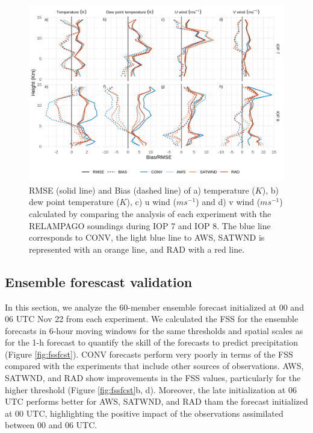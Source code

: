 \documentclass[final,5p,times,twocolumn,authoryear]{elsarticle} %
\begin{document}
\begin{figure}[t]

{\centering \includegraphics{../figures/soundings-1} 

}

\caption{RMSE (solid line) and Bias (dashed line) of a) temperature (\(K\)), b) dew point temperature (\(K\)), c) u wind (\(ms^{-1}\)) and d) v wind (\(ms^{-1}\)) calculated by comparing the analysis of each experiment with the RELAMPAGO soundings during IOP 7 and IOP 8. The blue line corresponds to CONV, the light blue line to AWS, SATWND is represented with an orange line, and RAD with a red line.}\label{fig:soundings}
\end{figure}

\hypertarget{ensemble-forescast-validation}{%
\subsection{Ensemble forescast validation}\label{ensemble-forescast-validation}}

In this section, we analyze the 60-member ensemble forecast initialized at 00 and 06 UTC Nov 22 from each experiment. We calculated the FSS for the ensemble forecasts in 6-hour moving windows for the same thresholds and spatial scales as for the 1-h forecast to quantify the skill of the forecasts to predict precipitation (Figure \ref{fig:fssfcst}). CONV forecasts perform very poorly in terms of the FSS compared with the experiments that include other sources of observations. AWS, SATWND, and RAD show improvements in the FSS values, particularly for the higher threshold (Figure \ref{fig:fssfcst}b, d). Moreover, the late initialization at 06 UTC performs better for AWS, SATWND, and RAD tham the forecast initialized at 00 UTC, highlighting the positive impact of the observations assimilated between 00 and 06 UTC.
\end{document}
